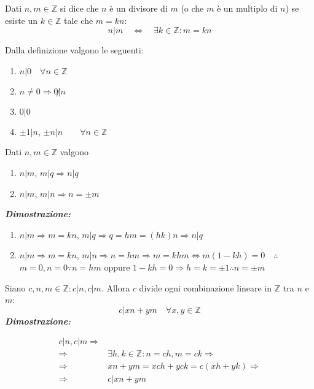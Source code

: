 \begin{tcolorbox}[colback=yellow!30, colframe=yellow!30!black, title=Divisibilità]
Dati $n,m \in \mathbb{Z}$ si dice che $n$ è un divisore di
$m$ (o che $m$ è un multiplo di $n$) se esiste un $k \in \mathbb{Z}$
tale che $m = kn$:
\[ n|m \quad \Longleftrightarrow \quad \exists k \in \mathbb{Z}: m = kn\]
\end{tcolorbox}

\begin{osservaz}
Dalla definizione valgono le seguenti:
\begin{enumerate}
    \item $n|0 \quad \forall n \in \mathbb{Z}$
    \item $n \not = 0 \Longrightarrow 0 \not | n$
    \item $0|0$
    \item $\pm 1 | n$, $\pm n|n \qquad \forall n \in \mathbb{Z}$
\end{enumerate}
\end{osservaz}

\begin{tcolorbox}[title={Proprietà della divisibilità}]
Dati $n,m\in\mathbb{Z}$ valgono
\begin{enumerate}
    \item $n|m$, $m|q \Longrightarrow n|q$
    \item $n|m$, $m|n \Longrightarrow n = \pm m$
\end{enumerate}
\textit{\textbf{Dimostrazione:}}
\begin{enumerate}
    \item $n|m \Rightarrow m = kn$, $m|q \Rightarrow q = hm = (hk)n \Longrightarrow n|q$
    \item $n|m \Rightarrow m = kn$, $m|n \Rightarrow n = hm \Longrightarrow m = khm \Longleftrightarrow m(1-kh) = 0 \quad \therefore \quad$ $m = 0, n = 0 \because n = hm$ oppure
    $1 - kh = 0 \Longrightarrow h = k = \pm 1 \therefore n = \pm m$
\end{enumerate}
\cvd
\end{tcolorbox}

\begin{tcolorbox}[colback=violet!30, colframe=violet!30!black, title={Lemma utile}]
Siano $c,n,m\in\mathbb{Z}:c|n,c|m$. Allora $c$ divide ogni combinazione lineare
in $\mathbb{Z}$ tra $n$ e $m$:
\[ c|xn+ym \quad \forall x,y\in\mathbb{Z} \]
\textit{\textbf{Dimostrazione:}}

\begin{align*}
    c|n,c|m \Rightarrow&\\
    \Rightarrow &\exists h,k\in\mathbb{Z}:n=ch,m=ck \Rightarrow\\
    \Rightarrow &xn+ym=xch+yck=c(xh+yk) \Rightarrow\\
    \Rightarrow &c|xn+ym
\end{align*}

\cvd
\end{tcolorbox}


